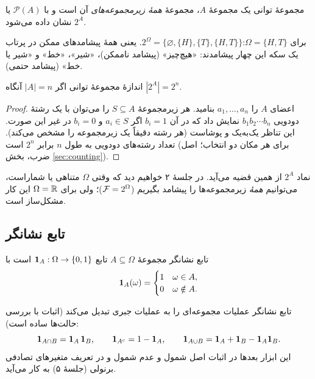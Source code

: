 \begin{definition}{مجموعهٔ توانی}
 یک مجموعهٔ $A$، مجموعهٔ \emph{همهٔ زیرمجموعه‌های} آن است و با $\mathcal P(A)$ یا $2^A$ نشان داده می‌شود.
\end{definition}

\begin{example}{}
برای $\Omega=\{H,T\}$:\quad $2^\Omega=\bigl\{\varnothing,\{H\},\{T\},\{H,T\}\bigr\}$. یعنی همهٔ پیشامدهای ممکن در پرتاب یک سکه این چهار پیشامدند: «هیچ‌چیز» (پیشامد ناممکن)، «شیر»، «خط» و «شیر یا خط» (پیشامد حتمی).
\end{example}

\begin{theorem}[label=thm:powerset]{اندازهٔ مجموعهٔ توانی}
اگر $|A|=n$ آنگاه $|2^A|=2^n$.
\end{theorem}

\begin{proof}
اعضای $A$ را $a_1,\dots,a_n$ بنامید. هر زیرمجموعهٔ $S\subseteq A$ را می‌توان با یک رشتهٔ دودویی $b_1b_2\cdots b_n$ نمایش داد که در آن $b_i=1$ اگر $a_i\in S$ و $b_i=0$ در غیر این صورت. این تناظر یک‌به‌یک و پوشاست (هر رشته دقیقاً یک زیرمجموعه را مشخص می‌کند). تعداد رشته‌های دودویی به طول $n$ برابر $2^n$ است (برای هر مکان دو انتخاب؛ اصل ضرب، بخش \ref{sec:counting}).
\end{proof}

\begin{note}
نماد $2^A$ از همین قضیه می‌آید. در جلسهٔ ۲ خواهیم دید که وقتی $\Omega$ متناهی یا شماراست، می‌توانیم \emph{همهٔ} زیرمجموعه‌ها را پیشامد بگیریم ($\mathcal{F}=2^\Omega$)؛ ولی برای $\Omega=\mathbb{R}$ این کار مشکل‌ساز است.
\end{note}

\subsection{تابع نشانگر}

\begin{definition}{تابع نشانگر}
 مجموعهٔ $A\subseteq\Omega$ تابع $\mathbf{1}_A:\Omega\to\{0,1\}$ است با
\[ \mathbf{1}_A(\omega)=\begin{cases}1 & \omega\in A,\\ 0 & \omega\notin A.\end{cases} \]
\end{definition}

تابع نشانگر عملیات مجموعه‌ای را به عملیات جبری تبدیل می‌کند (اثبات با بررسی حالت‌ها ساده است):
\[
\mathbf{1}_{A\cap B}=\mathbf{1}_A\,\mathbf{1}_B,\qquad
\mathbf{1}_{A^c}=1-\mathbf{1}_A,\qquad
\mathbf{1}_{A\cup B}=\mathbf{1}_A+\mathbf{1}_B-\mathbf{1}_A\mathbf{1}_B .
\]
این ابزار بعدها در اثبات اصل شمول و عدم شمول و در تعریف متغیرهای تصادفی برنولی (جلسهٔ ۵) به کار می‌آید.

